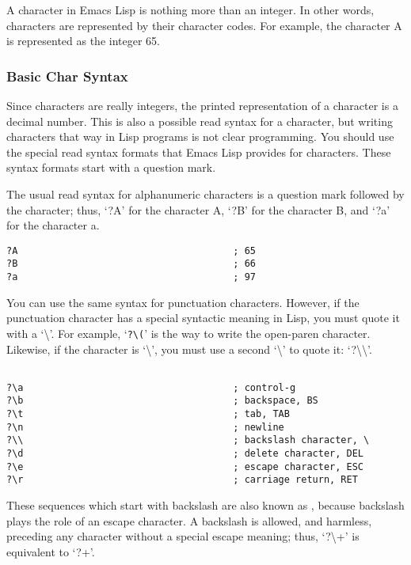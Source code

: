 A character in Emacs Lisp is nothing more than an integer.
In other words, characters are represented by their character codes.
For example, the character A is represented as the integer 65.


\subsubsection{Basic Char Syntax}
\label{sec:basic-char-syntax}

Since characters are really integers, the printed representation of a character is a decimal number.
This is also a possible read syntax for a character, but writing characters that way in Lisp programs is not clear programming.
You should  use the special read syntax formats that Emacs Lisp provides for characters.
These syntax formats start with a question mark.


The usual read syntax for alphanumeric characters is a question mark followed by the character; thus, ‘?A’ for the character A, ‘?B’ for the character B, and ‘?a’ for the character a.
\begin{lstlisting}
?A                                      ; 65
?B                                      ; 66
?a                                      ; 97
\end{lstlisting}


You can use the same syntax for punctuation characters.
However, if the punctuation character has a special syntactic meaning in Lisp, you must quote it with a ‘\textbackslash{}’.
For example, ‘\lstinline|?\(|’ is the way to write the open-paren character.
Likewise, if the character is ‘\textbackslash’, you must use a second ‘\textbackslash’ to quote it: ‘?\textbackslash\textbackslash’.

\begin{lstlisting}

?\a                                     ; control-g
?\b                                     ; backspace, BS
?\t                                     ; tab, TAB
?\n                                     ; newline
?\\                                     ; backslash character, \
?\d                                     ; delete character, DEL
?\e                                     ; escape character, ESC
?\r                                     ; carriage return, RET

\end{lstlisting}

These sequences which start with backslash are also known as , because backslash plays the role of an escape character.
A backslash is allowed, and harmless, preceding any character without a special escape meaning; thus, ‘?\textbackslash{}+’ is equivalent to ‘?+’.



